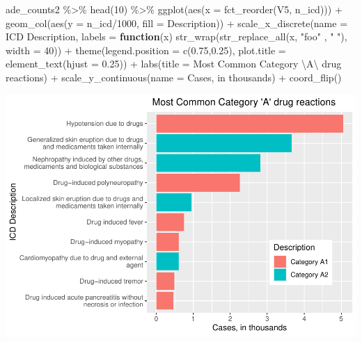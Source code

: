 \documentclass[preprint, 3p,
authoryear]{elsarticle} %
\newenvironment{Shaded}{\begin{snugshade}}{\end{snugshade}}
\newcommand{\AttributeTok}[1]{\textcolor[rgb]{0.77,0.63,0.00}{#1}}
\newcommand{\ControlFlowTok}[1]{\textcolor[rgb]{0.13,0.29,0.53}{\textbf{#1}}}
\newcommand{\DecValTok}[1]{\textcolor[rgb]{0.00,0.00,0.81}{#1}}
\newcommand{\FloatTok}[1]{\textcolor[rgb]{0.00,0.00,0.81}{#1}}
\newcommand{\FunctionTok}[1]{\textcolor[rgb]{0.00,0.00,0.00}{#1}}
\newcommand{\NormalTok}[1]{#1}
\newcommand{\SpecialCharTok}[1]{\textcolor[rgb]{0.00,0.00,0.00}{#1}}
\newcommand{\StringTok}[1]{\textcolor[rgb]{0.31,0.60,0.02}{#1}}
\begin{document}
\begin{Shaded}
\begin{Highlighting}[]
\NormalTok{ade\_counts2 }\SpecialCharTok{\%\textgreater{}\%}
  \FunctionTok{head}\NormalTok{(}\DecValTok{10}\NormalTok{) }\SpecialCharTok{\%\textgreater{}\%}
  \FunctionTok{ggplot}\NormalTok{(}\FunctionTok{aes}\NormalTok{(}\AttributeTok{x =} \FunctionTok{fct\_reorder}\NormalTok{(V5, n\_icd))) }\SpecialCharTok{+}
  \FunctionTok{geom\_col}\NormalTok{(}\FunctionTok{aes}\NormalTok{(}\AttributeTok{y =}\NormalTok{ n\_icd}\SpecialCharTok{/}\DecValTok{1000}\NormalTok{, }\AttributeTok{fill =}\NormalTok{ Description)) }\SpecialCharTok{+} 
  \FunctionTok{scale\_x\_discrete}\NormalTok{(}\AttributeTok{name =} \StringTok{\textquotesingle{}ICD Description\textquotesingle{}}\NormalTok{, }\AttributeTok{labels =} \ControlFlowTok{function}\NormalTok{(x) }\FunctionTok{str\_wrap}\NormalTok{(}\FunctionTok{str\_replace\_all}\NormalTok{(x, }\StringTok{"foo"}\NormalTok{ , }\StringTok{" "}\NormalTok{),}
                                                 \AttributeTok{width =} \DecValTok{40}\NormalTok{)) }\SpecialCharTok{+}
  \FunctionTok{theme}\NormalTok{(}\AttributeTok{legend.position =} \FunctionTok{c}\NormalTok{(}\FloatTok{0.75}\NormalTok{,}\FloatTok{0.25}\NormalTok{), }\AttributeTok{plot.title =} \FunctionTok{element\_text}\NormalTok{(}\AttributeTok{hjust =} \FloatTok{0.25}\NormalTok{)) }\SpecialCharTok{+}
  \FunctionTok{labs}\NormalTok{(}\AttributeTok{title =} \StringTok{\textquotesingle{}Most Common Category }\SpecialCharTok{\textbackslash{}\textquotesingle{}}\StringTok{A}\SpecialCharTok{\textbackslash{}\textquotesingle{}}\StringTok{ drug reactions\textquotesingle{}}\NormalTok{) }\SpecialCharTok{+}
  \FunctionTok{scale\_y\_continuous}\NormalTok{(}\AttributeTok{name =} \StringTok{\textquotesingle{}Cases, in thousands\textquotesingle{}}\NormalTok{) }\SpecialCharTok{+}
  \FunctionTok{coord\_flip}\NormalTok{() }
\end{Highlighting}
\end{Shaded}

\includegraphics{final-project-paper_files/figure-latex/top-10-ade-cat-a-1.pdf}
\end{document}
